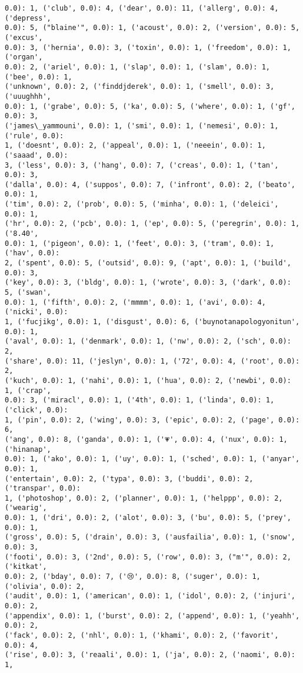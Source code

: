 \documentclass[11pt]{article}
\begin{document}
\begin{Verbatim}[commandchars=\\\{\}]
0.0): 1, ('club', 0.0): 4, ('dear', 0.0): 11, ('allerg', 0.0): 4, ('depress',
0.0): 5, ("blaine'", 0.0): 1, ('acoust', 0.0): 2, ('version', 0.0): 5, ('excus',
0.0): 3, ('hernia', 0.0): 3, ('toxin', 0.0): 1, ('freedom', 0.0): 1, ('organ',
0.0): 2, ('ariel', 0.0): 1, ('slap', 0.0): 1, ('slam', 0.0): 1, ('bee', 0.0): 1,
('unknown', 0.0): 2, ('finddjderek', 0.0): 1, ('smell', 0.0): 3, ('uuughhh',
0.0): 1, ('grabe', 0.0): 5, ('ka', 0.0): 5, ('where', 0.0): 1, ('gf', 0.0): 3,
('james\_yammouni', 0.0): 1, ('smi', 0.0): 1, ('nemesi', 0.0): 1, ('rule', 0.0):
1, ('doesnt', 0.0): 2, ('appeal', 0.0): 1, ('neeein', 0.0): 1, ('saaad', 0.0):
3, ('less', 0.0): 3, ('hang', 0.0): 7, ('creas', 0.0): 1, ('tan', 0.0): 3,
('dalla', 0.0): 4, ('suppos', 0.0): 7, ('infront', 0.0): 2, ('beato', 0.0): 1,
('tim', 0.0): 2, ('prob', 0.0): 5, ('minha', 0.0): 1, ('deleici', 0.0): 1,
('hr', 0.0): 2, ('pcb', 0.0): 1, ('ep', 0.0): 5, ('peregrin', 0.0): 1, ('8.40',
0.0): 1, ('pigeon', 0.0): 1, ('feet', 0.0): 3, ('tram', 0.0): 1, ('hav', 0.0):
2, ('spent', 0.0): 5, ('outsid', 0.0): 9, ('apt', 0.0): 1, ('build', 0.0): 3,
('key', 0.0): 3, ('bldg', 0.0): 1, ('wrote', 0.0): 3, ('dark', 0.0): 5, ('swan',
0.0): 1, ('fifth', 0.0): 2, ('mmmm', 0.0): 1, ('avi', 0.0): 4, ('nicki', 0.0):
1, ('fucjikg', 0.0): 1, ('disgust', 0.0): 6, ('buynotanapologyonitun', 0.0): 1,
('aval', 0.0): 1, ('denmark', 0.0): 1, ('nw', 0.0): 2, ('sch', 0.0): 2,
('share', 0.0): 11, ('jeslyn', 0.0): 1, ('72', 0.0): 4, ('root', 0.0): 2,
('kuch', 0.0): 1, ('nahi', 0.0): 1, ('hua', 0.0): 2, ('newbi', 0.0): 1, ('crap',
0.0): 3, ('miracl', 0.0): 1, ('4th', 0.0): 1, ('linda', 0.0): 1, ('click', 0.0):
1, ('pin', 0.0): 2, ('wing', 0.0): 3, ('epic', 0.0): 2, ('page', 0.0): 6,
('ang', 0.0): 8, ('ganda', 0.0): 1, ('💗', 0.0): 4, ('nux', 0.0): 1, ('hinanap',
0.0): 1, ('ako', 0.0): 1, ('uy', 0.0): 1, ('sched', 0.0): 1, ('anyar', 0.0): 1,
('entertain', 0.0): 2, ('typa', 0.0): 3, ('buddi', 0.0): 2, ('transpar', 0.0):
1, ('photoshop', 0.0): 2, ('planner', 0.0): 1, ('helppp', 0.0): 2, ('wearig',
0.0): 1, ('dri', 0.0): 2, ('alot', 0.0): 3, ('bu', 0.0): 5, ('prey', 0.0): 1,
('gross', 0.0): 5, ('drain', 0.0): 3, ('ausfailia', 0.0): 1, ('snow', 0.0): 3,
('footi', 0.0): 3, ('2nd', 0.0): 5, ('row', 0.0): 3, ("m'", 0.0): 2, ('kitkat',
0.0): 2, ('bday', 0.0): 7, ('😢', 0.0): 8, ('suger', 0.0): 1, ('olivia', 0.0): 2,
('audit', 0.0): 1, ('american', 0.0): 1, ('idol', 0.0): 2, ('injuri', 0.0): 2,
('appendix', 0.0): 1, ('burst', 0.0): 2, ('append', 0.0): 1, ('yeahh', 0.0): 2,
('fack', 0.0): 2, ('nhl', 0.0): 1, ('khami', 0.0): 2, ('favorit', 0.0): 4,
('rise', 0.0): 3, ('reaali', 0.0): 1, ('ja', 0.0): 2, ('naomi', 0.0): 1,

\end{Verbatim}
\end{document}
